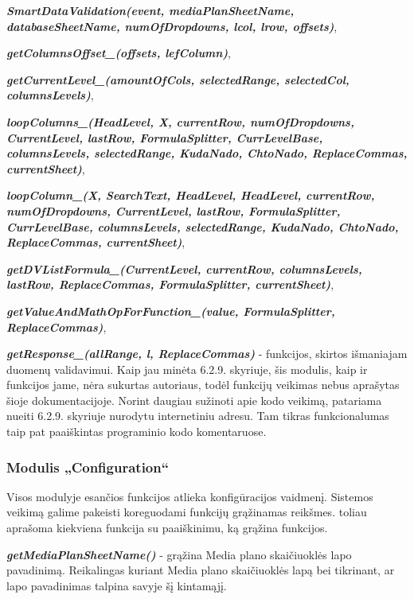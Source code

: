 \bigskip
\textit{\textbf{SmartDataValidation(event, mediaPlanSheetName, databaseSheetName, numOfDropdowns, lcol, lrow, offsets)}}, 

\textit{\textbf{getColumnsOffset\_(offsets, lefColumn)}}, 

\textit{\textbf{getCurrentLevel\_(amountOfCols, selectedRange, selectedCol, columnsLevels)}}, 

\textit{\textbf{loopColumns\_(HeadLevel, X, currentRow, numOfDropdowns, CurrentLevel, lastRow, FormulaSplitter, CurrLevelBase, columnsLevels, selectedRange, KudaNado, ChtoNado, ReplaceCommas, currentSheet)}}, 

\textit{\textbf{loopColumn\_(X, SearchText, HeadLevel, HeadLevel, currentRow, numOfDropdowns, CurrentLevel, lastRow, FormulaSplitter, CurrLevelBase, columnsLevels, selectedRange, KudaNado, ChtoNado, ReplaceCommas, currentSheet)}}, 

\textit{\textbf{getDVListFormula\_(CurrentLevel, currentRow, columnsLevels, lastRow, ReplaceCommas, FormulaSplitter, currentSheet)}}, 

\textit{\textbf{getValueAndMathOpForFunction\_(value, FormulaSplitter, ReplaceCommas)}}, 

\textit{\textbf{getResponse\_(allRange, l, ReplaceCommas)}} - funkcijos, skirtos išmaniajam duomenų validavimui. Kaip jau minėta 6.2.9. skyriuje, šis modulis, kaip ir funkcijos jame, nėra sukurtas autoriaus, todėl funkcijų veikimas nebus aprašytas šioje dokumentacijoje. Norint daugiau sužinoti apie kodo veikimą, patariama nueiti 6.2.9. skyriuje nurodytu internetiniu adresu. Tam tikras funkcionalumas taip pat paaiškintas programinio kodo komentaruose.



\subsubsection{Modulis „Configuration“}

Visos modulyje esančios funkcijos atlieka konfigūracijos vaidmenį. Sistemos veikimą galime pakeisti koreguodami funkcijų grąžinamas reikšmes. toliau aprašoma kiekviena funkcija su paaiškinimu, ką grąžina funkcijos.

\textit{\textbf{getMediaPlanSheetName()}} - grąžina Media plano skaičiuoklės lapo pavadinimą. Reikalingas kuriant Media plano skaičiuoklės lapą bei tikrinant, ar lapo pavadinimas talpina savyje šį kintamąjį.

